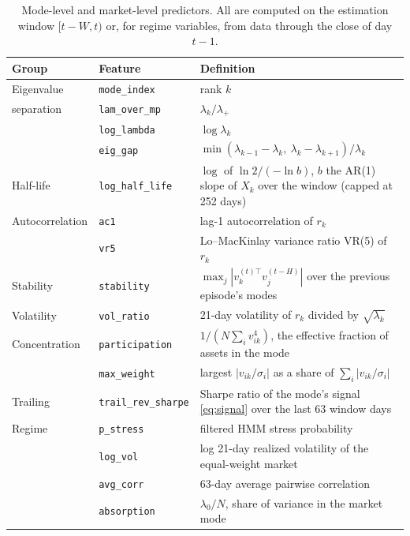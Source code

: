 \begin{table}[t]
\centering\small
\caption{Mode-level and market-level predictors. All are computed on the
estimation window $[t-W,t)$ or, for regime variables, from data through
the close of day $t-1$.}
\label{tab:features}
\begin{tabular}{@{}llp{8.4cm}@{}}
\toprule
Group & Feature & Definition \\
\midrule
Eigenvalue & \texttt{mode\_index} & rank $k$ \\
separation & \texttt{lam\_over\_mp} & $\lambda_k/\lambda_+$ \\
 & \texttt{log\_lambda} & $\log\lambda_k$ \\
 & \texttt{eig\_gap} & $\min(\lambda_{k-1}-\lambda_k,\ \lambda_k-\lambda_{k+1})/\lambda_k$ \\
Half-life & \texttt{log\_half\_life} & $\log$ of $\ln2/(-\ln b)$, $b$ the AR(1) slope of $X_k$ over the window (capped at 252 days) \\
Autocorrelation & \texttt{ac1} & lag-1 autocorrelation of $r_k$ \\
 & \texttt{vr5} & Lo--MacKinlay variance ratio VR(5) of $r_k$ \citep{lomackinlay1988} \\
Stability & \texttt{stability} & $\max_j |v_k^{(t)\top}v_j^{(t-H)}|$ over the previous episode's modes \\
Volatility & \texttt{vol\_ratio} & 21-day volatility of $r_k$ divided by $\sqrt{\lambda_k}$ \\
Concentration & \texttt{participation} & $1/(N\sum_i v_{ik}^4)$, the effective fraction of assets in the mode \\
 & \texttt{max\_weight} & largest $|v_{ik}/\sigma_i|$ as a share of $\sum_i|v_{ik}/\sigma_i|$ \\
Trailing & \texttt{trail\_rev\_sharpe} & Sharpe ratio of the mode's signal \eqref{eq:signal} over the last 63 window days \\
\midrule
Regime & \texttt{p\_stress} & filtered HMM stress probability \\
 & \texttt{log\_vol} & log 21-day realized volatility of the equal-weight market \\
 & \texttt{avg\_corr} & 63-day average pairwise correlation \\
 & \texttt{absorption} & $\lambda_0/N$, share of variance in the market mode \citep{kritzman2011} \\
\bottomrule
\end{tabular}
\end{table}

